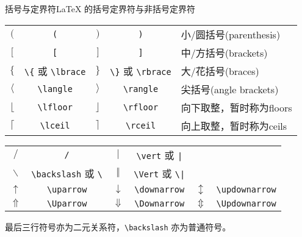 \documentclass[mathserif]{beamer}
\begin{document}
\begin{frame}[fragile]{括号与定界符}{\LaTeX{} 的括号定界符与非括号定界符}
\begin{table}[H]
\centering
\begin{tabular}{cc|cc|l}
	\toprule
	$($ & \lstinline'(' & $)$ & \lstinline')' & 小/圆括号(parenthesis) \\
	$[$ & \lstinline'[' & $]$ & \lstinline']' & 中/方括号(brackets) \\
	$\lbrace$ & \lstinline'\{' 或 \lstinline'\lbrace' & $\rbrace$ & \lstinline'\}' 或 \lstinline'\rbrace' & 大/花括号(braces) \\
	$\langle$ & \lstinline'\langle' & $\rangle$ & \lstinline'\rangle' & 尖括号(angle brackets) \\
	$\lfloor$ & \lstinline'\lfloor' & $\rfloor$ & \lstinline'\rfloor' & 向下取整，暂时称为floors \\
	$\lceil$ & \lstinline'\lceil' & $\rceil$ & \lstinline'\rceil' & 向上取整，暂时称为ceils \\
	\bottomrule
\end{tabular}
\end{table}

\begin{table}[H]
\centering
\begin{tabular}{cc|cc|cc}
	\toprule
	$/$ & \lstinline'/' & $\vert$ & \lstinline'\vert' 或 \lstinline'|' & ~ & ~ \\
	$\backslash$ & \lstinline'\backslash' 或 \lstinline'\' & $\Vert$ & \lstinline'\Vert' 或 \lstinline'\|' & ~ & ~ \\
	$\uparrow$ & \lstinline'\uparrow' & $\downarrow$ & \lstinline'\downarrow' & $\updownarrow$ & \lstinline'\updownarrow' \\
	$\Uparrow$ & \lstinline'\Uparrow' & $\Downarrow$ & \lstinline'\Downarrow' & $\Updownarrow$ & \lstinline'\Updownarrow' \\
	\bottomrule
\end{tabular}
\end{table}
最后三行符号亦为二元关系符，\lstinline'\backslash' 亦为普通符号。
\end{frame}
\end{document}
